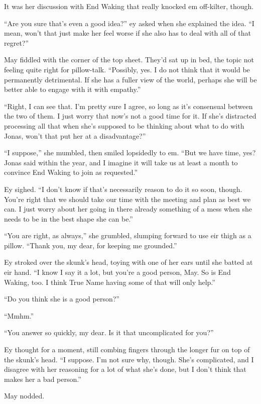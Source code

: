 It was her discussion with End Waking that really knocked em off-kilter, though.

``Are you sure that's even a good idea?'' ey asked when she explained the idea. ``I mean, won't that just make her feel worse if she also has to deal with all of that regret?''

May fiddled with the corner of the top sheet. They'd sat up in bed, the topic not feeling quite right for pillow-talk. ``Possibly, yes. I do not think that it would be permanently detrimental. If she has a fuller view of the world, perhaps she will be better able to engage with it with empathy.''

``Right, I can see that. I'm pretty sure I agree, so long as it's consensual between the two of them. I just worry that now's not a good time for it. If she's distracted processing all that when she's supposed to be thinking about what to do with Jonas, won't that put her at a disadvantage?''

``I suppose,'' she mumbled, then smiled lopsidedly to em. ``But we have time, yes? Jonas said within the year, and I imagine it will take us at least a month to convince End Waking to join as requested.''

Ey sighed. ``I don't know if that's necessarily reason to do it so soon, though. You're right that we should take our time with the meeting and plan as best we can. I just worry about her going in there already something of a mess when she needs to be in the best shape she can be.''

``You are right, as always,'' she grumbled, slumping forward to use eir thigh as a pillow. ``Thank you, my dear, for keeping me grounded.''

Ey stroked over the skunk's head, toying with one of her ears until she batted at eir hand. ``I know I say it a lot, but you're a good person, May. So is End Waking, too. I think True Name having some of that will only help.''

``Do you think she is a good person?''

``Mmhm.''

``You answer so quickly, my dear. Is it that uncomplicated for you?''

Ey thought for a moment, still combing fingers through the longer fur on top of the skunk's head. ``I suppose. I'm not sure why, though. She's complicated, and I disagree with her reasoning for a lot of what she's done, but I don't think that makes her a bad person.''

May nodded.

